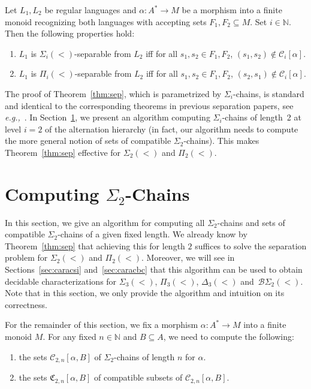 \documentclass[envcountsame]{llncs}
\newcommand\nat{\ensuremath{\mathbb{N}}\xspace}
\newcommand\Cs{\ensuremath{\mathcal{C}}\xspace}
\newcommand\Csi{\ensuremath{\Cs_i}\xspace}
\newcommand\Cstwolen[1]{\ensuremath{\Cs_{2,#1}}\xspace}
\newcommand\Cstwon{\ensuremath{\Cstwolen{n}}\xspace}
\newcommand\fCtwon{\ensuremath{\fC_{2,n}}\xspace}
\newcommand{\sic}[1]{\ensuremath{\Sigma_{#1}}\xspace}
\newcommand{\siwd}{\ensuremath{\Sigma_{2}(<)}\xspace}
\newcommand{\piwd}{\ensuremath{\Pi_{2}(<)}\xspace}
\newcommand{\bswd}{\ensuremath{\mathcal{B}\Sigma_{2}(<)}\xspace}
\newcommand{\dewt}{\ensuremath{\Delta_{3}(<)}\xspace}
\newcommand{\siwt}{\ensuremath{\Sigma_{3}(<)}\xspace}
\newcommand{\piwt}{\ensuremath{\Pi_{3}(<)}\xspace}
\newcommand{\siwi}{\ensuremath{\Sigma_{i}(<)}\xspace}
\newcommand{\piwi}{\ensuremath{\Pi_{i}(<)}\xspace}
\newcommand\qchains[1]{\ensuremath{\sic{#1}}-chains\xspace}
\newcommand\qChains[1]{\ensuremath{\sic{#1}}-Chains\xspace}
\newcommand\ichains{\qchains{i}}
\newcommand\dchains{\qchains{2}}
\newcommand\dChains{\qChains{2}}
\newcommand\fC{\ensuremath{\mathfrak C}\xspace}
\begin{document}
\begin{theorem} \label{thm:sep}
  Let $L_1,L_2$ be regular languages and $\alpha: A^* \rightarrow M$ be
  a morphism into a finite monoid recognizing both languages with
  accepting sets $F_1,F_2 \subseteq M$. Set $i \in \nat$. Then the
  following properties hold:
  \begin{enumerate}
  \item $L_1$ is $\siwi$-separable from $L_2$ iff for all $s_1,s_2
    \in F_1,F_2$, $(s_1,s_2) \not\in \Csi[\alpha]$.
  \item $L_1$ is $\piwi$-separable from $L_2$ iff for all $s_1,s_2
    \in F_1,F_2$, $(s_2,s_1) \not\in \Csi[\alpha]$.
  \end{enumerate}
\end{theorem}





The proof of Theorem~\ref{thm:sep}, which is parametrized by \ichains, is
standard and identical to the corresponding theorems in previous separation
papers, see \emph{e.g.,}~\cite{pzfo}. In Section~\ref{sec:comput}, we present
an algorithm computing \ichains of length~2 at level $i = 2$ of the
alternation hierarchy (in fact, our algorithm needs to compute the more
general notion of sets of compatible \dchains). This makes
Theorem~\ref{thm:sep} effective for \siwd and \piwd.



\section{Computing \dChains}
\label{sec:comput}
In this section, we give an algorithm for computing all \dchains and
sets of compatible \dchains of a given fixed length. We already know
by Theorem~\ref{thm:sep} that achieving this for length $2$ suffices
to solve the separation problem for \siwd and \piwd. Moreover, we will
see in Sections~\ref{sec:caracsi} and~\ref{sec:caracbc} that this
algorithm can be used to obtain decidable characterizations for 
\siwt, \piwt, \dewt and~\bswd. Note that in this section, we only provide the
algorithm and intuition on its correctness.

For the remainder of this section, we fix a morphism $\alpha: A^*
\rightarrow M$ into a finite monoid $M$. For any fixed $n \in \nat$
and $B \subseteq A$, we need to compute the following:

\begin{enumerate}
  \itemsep1ex
\item the sets $\Cstwon[\alpha,B]$ of \dchains of length $n$ for
  $\alpha$. 
\item the sets $\fCtwon[\alpha,B]$ of compatible subsets of
  $\Cstwon[\alpha,B]$.
\end{enumerate}
\end{document}
